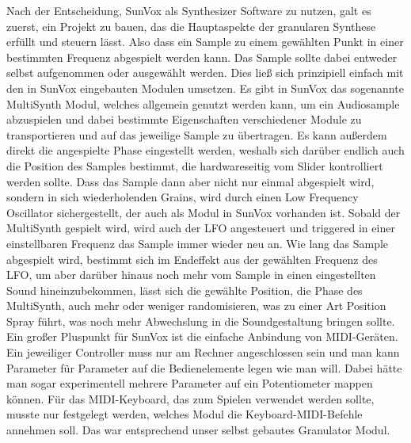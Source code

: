 \documentclass[12pt]{scrartcl}%
\theoremstyle{nonumberplain}
\begin{document}
Nach der Entscheidung, SunVox als Synthesizer Software zu nutzen, galt es zuerst, ein Projekt zu bauen, das die Hauptaspekte der granularen Synthese erfüllt und steuern lässt. Also dass ein Sample zu einem gewählten Punkt in einer bestimmten Frequenz abgespielt werden kann. Das Sample sollte dabei entweder selbst aufgenommen oder ausgewählt werden. Dies ließ sich prinzipiell einfach mit den in SunVox eingebauten Modulen umsetzen.
Es gibt in SunVox das sogenannte MultiSynth Modul, welches allgemein genutzt werden kann, um ein Audiosample abzuspielen und dabei bestimmte Eigenschaften verschiedener Module zu transportieren und auf das jeweilige Sample zu übertragen. Es kann außerdem direkt die angespielte Phase eingestellt werden, weshalb sich darüber endlich auch die Position des Samples bestimmt, die hardwareseitig vom Slider kontrolliert werden sollte. Dass das Sample dann aber nicht nur einmal abgespielt wird, sondern in sich wiederholenden Grains, wird durch einen Low Frequency Oscillator sichergestellt, der auch als Modul in SunVox vorhanden ist. Sobald der MultiSynth gespielt wird, wird auch der LFO angesteuert und triggered in einer einstellbaren Frequenz das Sample immer wieder neu an. Wie lang das Sample abgespielt wird, bestimmt sich im Endeffekt aus der gewählten Frequenz des LFO, um aber darüber hinaus noch mehr vom Sample in einen eingestellten Sound hineinzubekommen, lässt sich die gewählte Position, die Phase des MultiSynth, auch mehr oder weniger randomisieren, was zu einer Art Position Spray führt, was noch mehr Abwechslung in die Soundgestaltung bringen sollte.
Ein großer Pluspunkt für SunVox ist die einfache Anbindung von MIDI-Geräten. Ein jeweiliger Controller muss nur am Rechner angeschlossen sein und man kann Parameter für Parameter auf die Bedienelemente legen wie man will. Dabei hätte man sogar experimentell mehrere Parameter auf ein Potentiometer mappen können. Für das MIDI-Keyboard, das zum Spielen verwendet werden sollte, musste nur festgelegt werden, welches Modul die Keyboard-MIDI-Befehle annehmen soll. Das war entsprechend unser selbst gebautes Granulator Modul.
\end{document}
